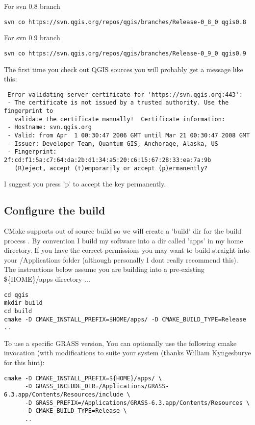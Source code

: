 For svn 0.8 branch

\begin{verbatim}
svn co https://svn.qgis.org/repos/qgis/branches/Release-0_8_0 qgis0.8
\end{verbatim}

For svn 0.9 branch

\begin{verbatim}
svn co https://svn.qgis.org/repos/qgis/branches/Release-0_9_0 qgis0.9
\end{verbatim}

The first time you check out QGIS sources you will probably get a message like
this:

\begin{verbatim}
 Error validating server certificate for 'https://svn.qgis.org:443':
 - The certificate is not issued by a trusted authority. Use the fingerprint to
   validate the certificate manually!  Certificate information:
 - Hostname: svn.qgis.org
 - Valid: from Apr  1 00:30:47 2006 GMT until Mar 21 00:30:47 2008 GMT
 - Issuer: Developer Team, Quantum GIS, Anchorage, Alaska, US
 - Fingerprint: 2f:cd:f1:5a:c7:64:da:2b:d1:34:a5:20:c6:15:67:28:33:ea:7a:9b
   (R)eject, accept (t)emporarily or accept (p)ermanently?  
\end{verbatim}

I suggest you press 'p' to accept the key permanently.

\subsection{Configure the build}
CMake supports out of source build so we will create a 'build' dir for the
build process . By convention I build my software into a dir called 'apps'
in my home directory. If you have the correct permissions you may want to 
build straight into your /Applications folder (although personally I dont 
really recommend this). The instructions below assume you are building into 
a pre-existing \$\{HOME\}/apps directory ...

\begin{verbatim}
cd qgis 
mkdir build 
cd build 
cmake -D CMAKE_INSTALL_PREFIX=$HOME/apps/ -D CMAKE_BUILD_TYPE=Release ..
\end{verbatim}

To use a specific GRASS version, You can optionally use the following 
cmake invocation (with modifications to suite your system (thanks William 
Kyngesburye for this hint):

\begin{verbatim}
cmake -D CMAKE_INSTALL_PREFIX=${HOME}/apps/ \
      -D GRASS_INCLUDE_DIR=/Applications/GRASS-6.3.app/Contents/Resources/include \
      -D GRASS_PREFIX=/Applications/GRASS-6.3.app/Contents/Resources \
      -D CMAKE_BUILD_TYPE=Release \
      ..
\end{verbatim}

